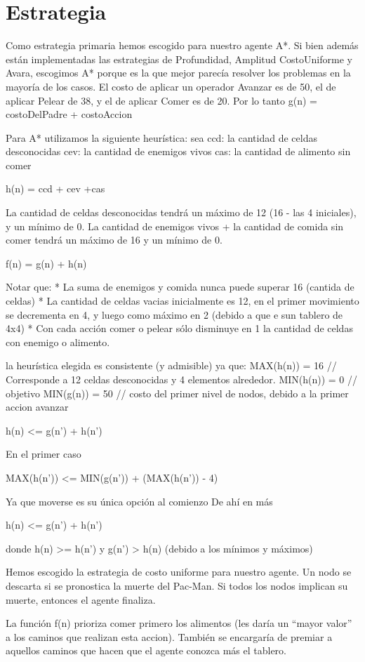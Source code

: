 \section{Estrategia}

Como estrategia primaria hemos escogido para nuestro agente A*.
Si bien además están implementadas las estrategias de Profundidad, Amplitud
CostoUniforme y Avara, escogimos A* porque es la que mejor parecía resolver los 
problemas en la mayoría de los casos.
El costo de aplicar un operador Avanzar es de 50, el de aplicar Pelear de 38, y el 
de aplicar Comer es de 20.
Por lo tanto
g(n) = costoDelPadre + costoAccion

Para A* utilizamos la siguiente heurística:
sea 
ccd: la cantidad de celdas desconocidas
cev: la cantidad de enemigos vivos
cas: la cantidad de alimento sin comer

h(n) = ccd + cev +cas

La cantidad de celdas desconocidas tendrá un máximo de 12 (16 - las 4 iniciales), 
y un mínimo de 0.
La cantidad de enemigos vivos + la cantidad de comida sin comer tendrá un máximo 
de 16 y un mínimo de 0.

f(n) = g(n) + h(n)

Notar que:
* La suma de enemigos y comida nunca puede superar 16 (cantida de celdas)
* La cantidad de celdas vacias inicialmente es 12, en el primer movimiento se decrementa 
en 4, y luego como máximo en 2 (debido a que e sun tablero de 4x4)
* Con cada acción comer o pelear sólo disminuye en 1 la cantidad de celdas
con enemigo o alimento.

la heurística elegida es consistente (y admisible) ya que:
MAX(h(n)) = 16    // Corresponde a 12 celdas desconocidas y 4 elementos alrededor.
MIN(h(n)) = 0     // objetivo
MIN(g(n)) =  50   // costo del primer nivel de nodos, debido a la primer accion avanzar

h(n) <= g(n') + h(n')

En el primer caso

MAX(h(n')) <= MIN(g(n')) + (MAX(h(n')) - 4)

Ya que moverse es su única opción al comienzo
De ahí en más

h(n) <= g(n') + h(n')

donde h(n) >= h(n')
y g(n') > h(n) (debido a los mínimos y máximos)

Hemos escogido la estrategia de costo uniforme para nuestro agente. Un nodo se
descarta si se pronostica la muerte del Pac-Man. Si todos los nodos implican su
muerte, entonces el agente finaliza.

La función f(n) prioriza comer primero los alimentos (les daría un ``mayor
valor'' a los caminos que realizan esta accion). También se encargaría de premiar
a aquellos caminos que hacen que el agente conozca más el tablero.

